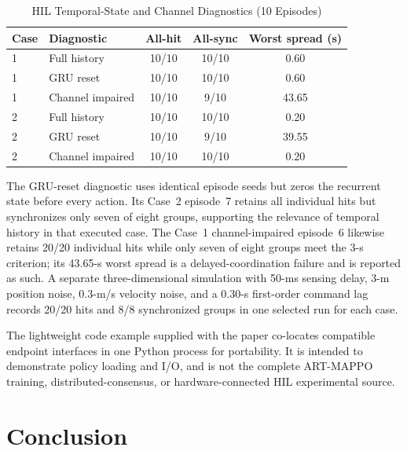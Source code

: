 \documentclass[lettersize,journal]{IEEEtran}
\providecommand{\DIFadd}[1]{{\protect\color{blue} #1}} %
\providecommand{\DIFaddbegin}{} %
\providecommand{\DIFaddend}{} %
\providecommand{\DIFaddFL}[1]{\DIFadd{#1}} %
\begin{document}
\begin{table}[!t]
\centering
\caption{\DIFaddFL{HIL Temporal-State and Channel Diagnostics (10 Episodes)}}
\label{tab:hil_results}
\footnotesize
\setlength{\tabcolsep}{3pt}
\begin{tabular}{llccc}
\toprule
\DIFaddFL{Case }& \DIFaddFL{Diagnostic }& \DIFaddFL{All-hit }& \DIFaddFL{All-sync }& \DIFaddFL{Worst spread (s) }\\
\midrule
\DIFaddFL{1 }& \DIFaddFL{Full history }& \DIFaddFL{10/10 }& \DIFaddFL{10/10 }& \DIFaddFL{0.60 }\\
\DIFaddFL{1 }& \DIFaddFL{GRU reset }& \DIFaddFL{10/10 }& \DIFaddFL{10/10 }& \DIFaddFL{0.60 }\\
\DIFaddFL{1 }& \DIFaddFL{Channel impaired }& \DIFaddFL{10/10 }& \DIFaddFL{9/10 }& \DIFaddFL{43.65 }\\
\DIFaddFL{2 }& \DIFaddFL{Full history }& \DIFaddFL{10/10 }& \DIFaddFL{10/10 }& \DIFaddFL{0.20 }\\
\DIFaddFL{2 }& \DIFaddFL{GRU reset }& \DIFaddFL{10/10 }& \DIFaddFL{9/10 }& \DIFaddFL{39.55 }\\
\DIFaddFL{2 }& \DIFaddFL{Channel impaired }& \DIFaddFL{10/10 }& \DIFaddFL{10/10 }& \DIFaddFL{0.20 }\\
\bottomrule
\end{tabular}
\end{table}

\DIFadd{The GRU-reset diagnostic uses identical episode seeds but zeros the recurrent
state before every action. Its Case~2 episode~7 retains all individual hits but
synchronizes only seven of eight groups, supporting the relevance of temporal
history in that executed case. The Case~1 channel-impaired episode~6 likewise
retains 20/20 individual hits while only seven of eight groups meet the 3-s
criterion; its 43.65-s worst spread is a delayed-coordination failure and is
reported as such. A separate three-dimensional simulation with 50-ms sensing
delay, 3-m position noise, 0.3-m/s velocity noise, and a 0.30-s first-order
command lag records 20/20 hits and 8/8 synchronized groups in one selected run
for each case.
}

\DIFadd{The lightweight code example supplied with the paper co-locates compatible
endpoint interfaces in one Python process for portability. It is intended to
demonstrate policy loading and I/O, and is not the complete ART-MAPPO training,
distributed-consensus, or hardware-connected HIL experimental source.
}



\DIFaddend %
\DIFaddbegin \clearpage
\DIFaddend \section{Conclusion}
\label{sec:conclusion}
\end{document}
